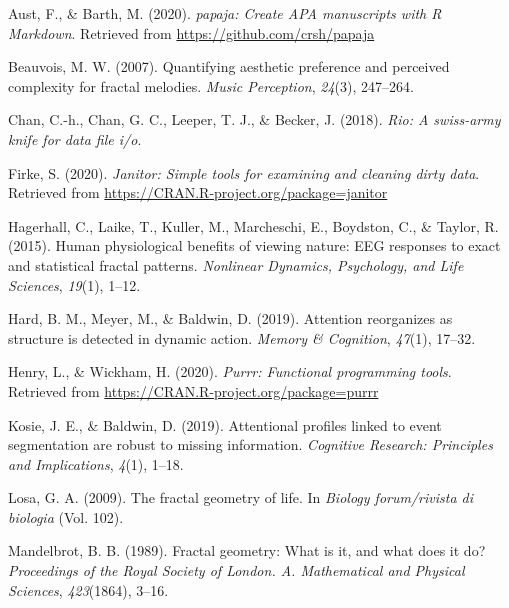 \documentclass[english,jou]{apa6}
\begin{document}
\begingroup
\setlength{\parindent}{-0.5in}
\setlength{\leftskip}{0.5in}

\hypertarget{refs}{}
\leavevmode\hypertarget{ref-R-papaja}{}%
Aust, F., \& Barth, M. (2020). \emph{papaja: Create APA manuscripts with R Markdown}. Retrieved from \url{https://github.com/crsh/papaja}

\leavevmode\hypertarget{ref-beauvois2007quantifying}{}%
Beauvois, M. W. (2007). Quantifying aesthetic preference and perceived complexity for fractal melodies. \emph{Music Perception}, \emph{24}(3), 247--264.

\leavevmode\hypertarget{ref-R-rio}{}%
Chan, C.-h., Chan, G. C., Leeper, T. J., \& Becker, J. (2018). \emph{Rio: A swiss-army knife for data file i/o}.

\leavevmode\hypertarget{ref-R-janitor}{}%
Firke, S. (2020). \emph{Janitor: Simple tools for examining and cleaning dirty data}. Retrieved from \url{https://CRAN.R-project.org/package=janitor}

\leavevmode\hypertarget{ref-hagerhall2015human}{}%
Hagerhall, C., Laike, T., Kuller, M., Marcheschi, E., Boydston, C., \& Taylor, R. (2015). Human physiological benefits of viewing nature: EEG responses to exact and statistical fractal patterns. \emph{Nonlinear Dynamics, Psychology, and Life Sciences}, \emph{19}(1), 1--12.

\leavevmode\hypertarget{ref-hard2019attention}{}%
Hard, B. M., Meyer, M., \& Baldwin, D. (2019). Attention reorganizes as structure is detected in dynamic action. \emph{Memory \& Cognition}, \emph{47}(1), 17--32.

\leavevmode\hypertarget{ref-R-purrr}{}%
Henry, L., \& Wickham, H. (2020). \emph{Purrr: Functional programming tools}. Retrieved from \url{https://CRAN.R-project.org/package=purrr}

\leavevmode\hypertarget{ref-kosie2019attentional}{}%
Kosie, J. E., \& Baldwin, D. (2019). Attentional profiles linked to event segmentation are robust to missing information. \emph{Cognitive Research: Principles and Implications}, \emph{4}(1), 1--18.

\leavevmode\hypertarget{ref-losa2009fractal}{}%
Losa, G. A. (2009). The fractal geometry of life. In \emph{Biology forum/rivista di biologia} (Vol. 102).

\leavevmode\hypertarget{ref-mandelbrot1989fractal}{}%
Mandelbrot, B. B. (1989). Fractal geometry: What is it, and what does it do? \emph{Proceedings of the Royal Society of London. A. Mathematical and Physical Sciences}, \emph{423}(1864), 3--16.
\end{document}
